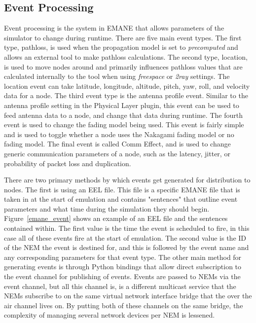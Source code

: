 \subsection{Event Processing}
Event processing is the system in EMANE that allows parameters of the simulator to change during runtime.
There are five main event types.
The first type, pathloss, is used when the propagation model is set to \textit{precomputed} and allows an external tool to make pathloss calculations.
The second type, location, is used to move nodes around and primarily influences pathloss values that are calculated internally to the tool when using \textit{freespace} or \textit{2ray} settings.
The location event can take latitude, longitude, altitude, pitch, yaw, roll, and velocity data for a node.
The third event type is the antenna profile event.
Similar to the antenna profile setting in the Physical Layer plugin, this event can be used to feed antenna data to a node, and change that data during runtime.
The fourth event is used to change the fading model being used.
This event is fairly simple and is used to toggle whether a node uses the Nakagami fading model or no fading model.
The final event is called Comm Effect, and is used to change generic communication parameters of a node, such as the latency, jitter, or probability of packet loss and duplication.\par
There are two primary methods by which events get generated for distribution to nodes.
The first is using an EEL file.
This file is a specific EMANE file that is taken in at the start of emulation and contains "sentences" that outline event parameters and what time during the simulation they should begin.
Figure~\ref{emane_event} shows an example of an EEL file and the sentences contained within.
The first value is the time the event is scheduled to fire, in this case all of these events fire at the start of emulation.
The second value is the ID of the NEM the event is destined for, and this is followed by the event name and any corresponding parameters for that event type.
The other main method for generating events is through Python bindings that allow direct subscription to the event channel for publishing of events.
Events are passed to NEMs via the event channel, but all this channel is, is a different multicast service that the NEMs subscribe to on the same virtual network interface bridge that the over the air channel lives on.
By putting both of these channels on the same bridge, the complexity of managing several network devices per NEM is lessened.

